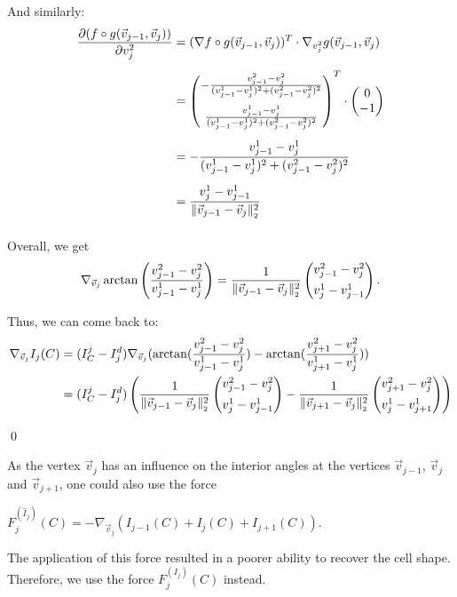 \begin{proposition}
	And similarly:
	\begin{align*}
		\frac{\partial (f \circ g (\vec{v}_{j-1}, \vec{v}_j))}{\partial v_j^2} &= (\nabla f \circ g (\vec{v}_{j-1}, \vec{v}_j))^T \cdot \nabla_{v_j^2} g (\vec{v}_{j-1}, \vec{v}_j) \\[0.5em]
		&= \begin{pmatrix}
			- \frac{v_{j-1}^2 - v_{j}^2}{(v_{j-1}^1 - v_{j}^1)^2 + (v_{j-1}^2 - v_{j}^2)^2} \\[1.0em]
			\frac{v_{j-1}^1 - v_{j}^1}{(v_{j-1}^1 - v_{j}^1)^2 + (v_{j-1}^2 - v_{j}^2)^2}
		\end{pmatrix}^T
		\cdot 
		\begin{pmatrix}
			0 \\
			-1
		\end{pmatrix} \\[0.5em]
		&= - \frac{v_{j-1}^1 - v_{j}^1}{(v_{j-1}^1 - v_{j}^1)^2 + (v_{j-1}^2 - v_{j}^2)^2} \\[0.5em]
		&= \frac{v_{j}^1 - v_{j-1}^1}{\norm[\vec{v}_{j-1} - \vec{v}_j]^2} \\[0.5em]
	\end{align*}

	Overall, we get 
	\begin{align*}
		\nabla_{\vec{v}_j} \arctan \left(\frac{v_{j-1}^2 - v_{j}^2}{v_{j-1}^1 - v_{j}^1} \right) = \frac{1}{\norm[\vec{v}_{j-1} - \vec{v}_j]^2} \begin{pmatrix}
			v_{j-1}^2 - v_{j}^2 \\[0.5em]
			v_{j}^1 - v_{j-1}^1
		\end{pmatrix}.
	\end{align*}
	
	Thus, we can come back to: 
	\begin{align*}
		\nabla_{\vec{v}_j}  I_{j}(C) 
		&= (I^j_{C} - I_{j}^d) \nabla_{\vec{v}_j} (\arctan(\frac{v_{j-1}^2 - v_{j}^2}{v_{j-1}^1 - v_{j}^1}) - \arctan(\frac{v_{j+1}^2 - v_{j}^2}{v_{j+1}^1 - v_{j}^1})) \\
		&= (I^j_{C} - I_{j}^d) \left( 
		  \frac{1}{\norm[\vec{v}_{j-1} - \vec{v}_j]^2} \begin{pmatrix}
			v_{j-1}^2 - v_{j}^2 \\[0.5em]
			v_{j}^1 - v_{j-1}^1
		\end{pmatrix} 
		- \frac{1}{\norm[\vec{v}_{j+1} - \vec{v}_j]^2} \begin{pmatrix}
			v_{j+1}^2 - v_{j}^2 \\[0.5em]
			v_{j}^1 - v_{j+1}^1
		\end{pmatrix} \right) 
	\end{align*}

	\qed
\end{proposition}
As the vertex $\vec{v}_j$ has an influence on the interior angles at the vertices $\vec{v}_{j-1}$, $\vec{v}_{j}$ and $\vec{v}_{j+1}$, one could also use the force 
\begin{center}
	$
	F^{(\hat{I}_{j})}_j(C) = - \nabla_{\vec{v}_j} (I_{j-1}(C) + I_{j}(C) + I_{j+1}(C)).
	$
\end{center}
The application of this force resulted in a poorer ability to recover the cell shape.
Therefore, we use the force $F^{(I_{j})}_j(C)$ instead.


